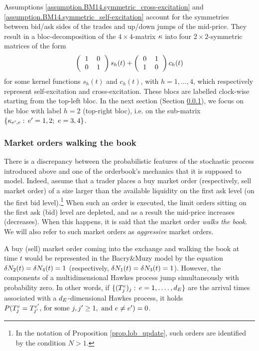 \documentclass[10pt, article,table]{article}
\begin{document}
Assumptions \ref{assumption.BM14.symmetric_cross-excitation} and \ref{assumption.BM14.symmetric_self-excitation} account for the symmetries between bid/ask sides of the trades and up/down jumps of the mid-price. They result in a bloc-decomposition of the $4\times4$-matrix $\hawkesKernel$ into four $2\times2$-symmetric matrices of the form
\begin{equation*}
 \left(
 \begin{tabular}{cc}
  1 & 0 \\ 0 & 1
 \end{tabular}
 \right)s_h(t)
 +
 \left(
 \begin{tabular}{cc}
  0 & 1 \\ 1 & 0
 \end{tabular}
\right) c_h(t)
\end{equation*}
for some kernel functions $s_h(t)$ and $c_h(t)$, with $h=1,\dots,4$, which respectively represent self-excitation and cross-excitation. These blocs are labelled clock-wise starting from the top-left bloc. In the next section (Section \ref{sec.BM14_walking_the_book}), we focus on the bloc with label $h=2$ (top-right bloc), i.e. on the sub-matrix $\lbrace \hawkesKernel_{\eone,e}: \, \eone =1,2; \, \, e=3,4 \rbrace$.
\subsubsection{Market orders walking the book}\label{sec.BM14_walking_the_book}
There is a discrepancy between the probabilistic features of the stochastic process introduced above and one of the orderbook's mechanics that it is supposed to model. Indeed, assume that a trader places a buy market order (respectively,  sell market order) of a size larger than the available liquidity on the first ask level (on the first bid level).\footnote{In the notation of Proposition \ref{prop.lob_update}, such orders are identified by the condition $N>1$.} When such an order is executed, the limit orders sitting on the first ask (bid) level are depleted, and as a result the mid-price increases (decreases). When this happens, it is said that the market order \emph{walks the book}. We will also refer to such market orders as \emph{aggressive} market orders. 

A buy (sell) market order coming into the exchange and walking the book at time $t$ would be represented in the Bacry\&Muzy model by the equation $\delta\countingProc[2](t) = \delta\countingProc[4](t) = 1$ (respectively, $\delta\countingProc[1](t) = \delta\countingProc[3](t) = 1$). However, the components of a multidimensional Hawkes process jump simultaneously with probability zero. In other words, if $\lbrace (\arrivalTimes[e]_j)_j: \, e=1,.\dots,\numEventTypes\rbrace$ are the arrival times associated with a $\numEventTypes$-dimensional Hawkes process, it holds $\Prob(\arrivalTimes[e]_j = \arrivalTimes[\eone]_{j\derivative}, \, \text{for some } j,j\derivative\geq 1, \text{ and } e\ne\eone) = 0$.
\end{document}
